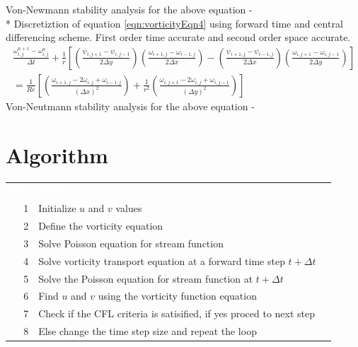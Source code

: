 \documentclass{article}
\newcommand{\head}[1]{%
   \textcolor{white}{\textbf{#1}}}
\begin{document}
Von-Newmann stability analysis for the above equation -
\\*
Discretiztion of equation \ref{eqn:vorticityEqn4}  using forward time and central differencing scheme. First order time accurate and second order space accurate. 
\begin{equation} 
\begin{split}
\frac{\omega_{i,j}^{n+1}-\omega_{i,j}^{n}}{\Delta t}+\frac{1}{r}\left[\left(\frac{\psi_{i,j+1}-\psi_{i,j-1}}{2\Delta y}\right)\left(\frac{\omega_{i+1,j}-\omega_{i-1,j}}{2\Delta x}\right) - \left(\frac{\psi_{i+1,j}-\psi_{i-1,j}}{2\Delta x}\right)\left(\frac{\omega_{i,j+1}-\omega_{i,j-1}}{2\Delta y}\right)  \right] \\
  = \frac{1}{Re}\left[\left(\frac{\omega_{i+1,j}-2\omega_{i,j}+\omega_{i-1,j}}{(\Delta x)^2}\right)+\frac{1}{r^2}\left(\frac{\omega_{i,j+1}-2\omega_{i,j}+\omega_{i,j-1}}{(\Delta y)^2}\right) \right]
\end{split}
\end{equation}
Von-Neutmann stability analysis for the above equation -

\section{Algorithm}
\begin{table}[ht]
   \centering
   \sffamily
   \begin{tabular}{rlr}
     \rowcolor{black!75}
      \head{No.}& \head{Steps}  \\
     1 & Initialize $u$ and $v$ values        \\
     2 & Define the vorticity equation    \\
     3 & Solve Poisson equation for stream function    \\
     4 & Solve vorticity transport equation at a forward time step $t+\Delta t$ \\
     5 & Solve the Poisson equation for stream function at  $t+\Delta t$   \\
     6 & Find $u$ and $v$ using the vorticity function equation      \\
     7 & Check if the CFL criteria is satisified, if yes proced to next step     \\
     8 & Else change the time step size and repeat the loop     \\
  \end{tabular}
\end{table}
\end{document}
